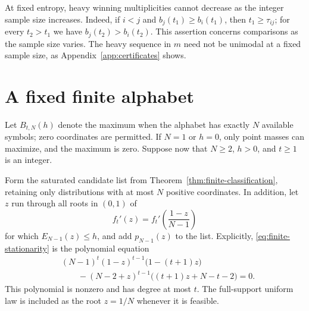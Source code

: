 \documentclass[11pt]{article}
\numberwithin{equation}{section}
\begin{document}
At fixed entropy, heavy winning multiplicities cannot decrease as the
integer sample size increases. Indeed, if $i<j$ and $b_j(t_1)\ge b_i(t_1)$,
then $t_1\ge\tau_{ij}$; for every $t_2>t_1$ we have
$b_j(t_2)>b_i(t_2)$. This assertion concerns comparisons as the sample
size varies. The heavy sequence in $m$ need not be unimodal at a fixed
sample size, as Appendix~\ref{app:certificates} shows.

\section{A fixed finite alphabet}\label{app:finite-alphabet}
Let $B_{t,N}(h)$ denote the maximum when the alphabet has exactly $N$
available symbols; zero coordinates are permitted. If $N=1$ or $h=0$,
only point masses can maximize, and the maximum is zero. Suppose now
that $N\ge2$, $h>0$, and $t\ge1$ is an integer.

Form the saturated candidate list from
Theorem~\ref{thm:finite-classification}, retaining only distributions
with at most $N$ positive coordinates. In addition, let $z$ run through
all roots in $(0,1)$ of
\begin{equation}\label{eq:finite-stationarity}
 f_t'(z)=f_t'\!\left(\frac{1-z}{N-1}\right)
\end{equation}
for which $E_{N-1}(z)\le h$, and add $p_{N-1}(z)$ to the list. Explicitly,
\eqref{eq:finite-stationarity} is the polynomial equation
\begin{equation}\label{eq:finite-polynomial}
 \begin{aligned}
 &(N-1)^t(1-z)^{t-1}\bigl(1-(t+1)z\bigr)\\
 &\qquad-(N-2+z)^{t-1}\bigl((t+1)z+N-t-2\bigr)=0.
 \end{aligned}
\end{equation}
This polynomial is nonzero and has degree at most $t$. The full-support
uniform law is included as the root $z=1/N$ whenever it is feasible.
\end{document}
